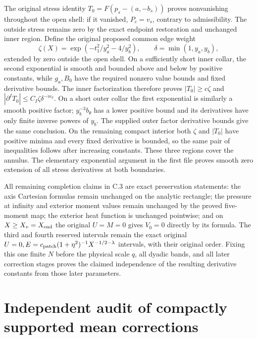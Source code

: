 \documentclass[10pt,a4paper]{article}
\begin{document}
The original stress identity \(T_0=F(p_s-(a,-b_s))\) proves nonvanishing throughout the open shell: if it vanished, \(P_c=v_s\), contrary to admissibility. The outside stress remains zero by the exact endpoint restoration and unchanged inner region. Define the original proposed common edge weight \[
\zeta(X)=\exp(-t_1^2/y_a^2-4/y_b^2),\qquad
\delta=\min(1,y_a,y_b),
\] extended by zero outside the open shell. On a sufficiently short inner collar, the second exponential is smooth and bounded above and below by positive constants, while \(g_a,B_0\) have the required nonzero value bounds and fixed derivative bounds. The inner factorization therefore proves \(|T_0|\ge c\zeta\) and \(|\partial^IT_0|\le C_I\zeta\delta^{-m_I}\). On a short outer collar the first exponential is similarly a smooth positive factor; \(y_b^{-3}b_\theta\) has a lower positive bound and its derivatives have only finite inverse powers of \(y_b\). The supplied outer factor derivative bounds give the same conclusion. On the remaining compact interior both \(\zeta\) and \(|T_0|\) have positive minima and every fixed derivative is bounded, so the same pair of inequalities follows after increasing constants. These three regions cover the annulus. The elementary exponential argument in the first file proves smooth zero extension of all stress derivatives at both boundaries.

All remaining completion claims in C.3 are exact preservation statements: the axis Cartesian formulas remain unchanged on the analytic rectangle; the pressure at infinity and exterior moment values remain unchanged by the proved five-moment map; the exterior heat function is unchanged pointwise; and on \(X\ge X_v=X_{\rm end}\) the original \(U=M=0\) gives \(V_0=0\) directly by its formula. The third and fourth reserved intervals remain the exact original \(U=0,E=c_{\rm patch}(1+\eta^2)^{-1}X^{-1/2-\lambda}\) intervals, with their original order. Fixing this one finite \(N\) before the physical scale \(q\), all dyadic bands, and all later correction stages proves the claimed independence of the resulting derivative constants from those later parameters.


\section{Independent audit of compactly supported mean corrections}
\end{document}
